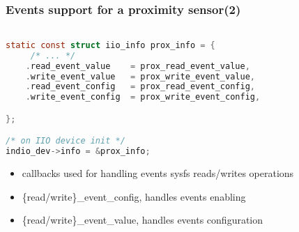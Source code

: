 \documentclass[aspectratio=169]{beamer}
\begin{document}

\begin{frame}[fragile]
\frametitle{Events support for a proximity sensor(2)}
\begin{lstlisting}[language=C]

static const struct iio_info prox_info = {
     /* ... */
    .read_event_value    = prox_read_event_value,
    .write_event_value   = prox_write_event_value,
    .read_event_config   = prox_read_event_config,
    .write_event_config  = prox_write_event_config,

};

/* on IIO device init */
indio_dev->info = &prox_info;

\end{lstlisting}
\begin{itemize}
    \item callbacks used for handling events sysfs reads/writes operations
    \item \{read/write\}\_event\_config, handles events enabling
    \item \{read/write\}\_event\_value, handles events configuration
\end{itemize}
\end{frame}



\end{document}
